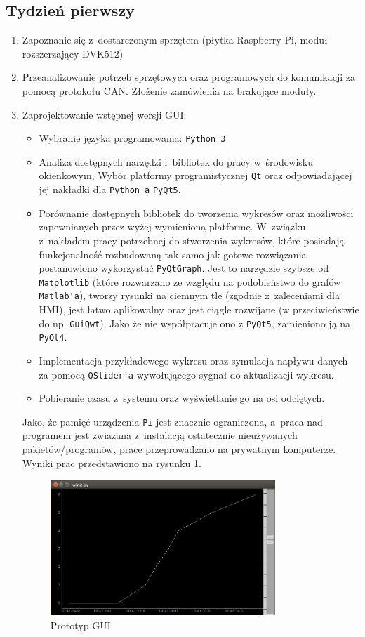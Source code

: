 \documentclass[a4paper, 12pt]{article}
\begin{document}
\subsection{Tydzień pierwszy}
\begin{enumerate}
	\item Zapoznanie się z~dostarczonym sprzętem (płytka Raspberry Pi, moduł rozszerzający DVK512)
	\item Przeanalizowanie potrzeb sprzętowych oraz programowych do komunikacji za pomocą protokołu CAN. Złożenie zamówienia na brakujące moduły.
	\item Zaprojektowanie wstępnej wersji GUI:
		\begin{itemize}
			\item Wybranie języka programowania: \verb|Python 3|
			\item Analiza dostępnych narzędzi i~bibliotek do pracy w~środowisku okienkowym, Wybór platformy programistycznej \verb|Qt| oraz odpowiadającej jej nakładki dla \verb|Python'a| \verb|PyQt5|.
			\item Porównanie dostępnych bibliotek do tworzenia wykresów oraz możliwości zapewnianych przez wyżej wymienioną platformę. W~związku z~nakładem pracy potrzebnej do stworzenia wykresów, które posiadają funkcjonalność rozbudowaną tak samo jak gotowe rozwiązania postanowiono wykorzystać \verb|PyQtGraph|. Jest to narzędzie szybsze od \verb|Matplotlib| (które rozwarzano ze względu na podobieństwo do grafów \verb|Matlab'a|), tworzy rysunki na ciemnym tle (zgodnie z~zaleceniami dla HMI), jest łatwo aplikowalny oraz jest ciągle rozwijane (w przeciwieństwie do np. \verb|GuiQwt|). Jako że nie współpracuje ono z \verb|PyQt5|, zamieniono ją na \verb|PyQt4|.
			\item Implementacja przykładowego wykresu oraz symulacja napływu danych za pomocą \verb|QSlider'a| wywołującego sygnał do aktualizacji wykresu. 
			\item Pobieranie czasu z~systemu oraz wyświetlanie go na osi odciętych.
		\end{itemize}
		Jako, że pamięć urządzenia \verb|Pi| jest znacznie ograniczona, a~praca nad programem jest zwiazana z~instalacją ostatecznie nieużywanych pakietów/programów, prace przeprowadzano na prywatnym komputerze. 
		Wyniki prac przedstawiono na rysunku \ref{fig:win2}.
		\begin{figure}[h!]
			\centering
			\includegraphics[width=0.8\textwidth]{zdjecia/tydzienuno.png}
			\caption{Prototyp GUI}
			\label{fig:win2}
		\end{figure}
\end{enumerate}
\newpage
\end{document}
